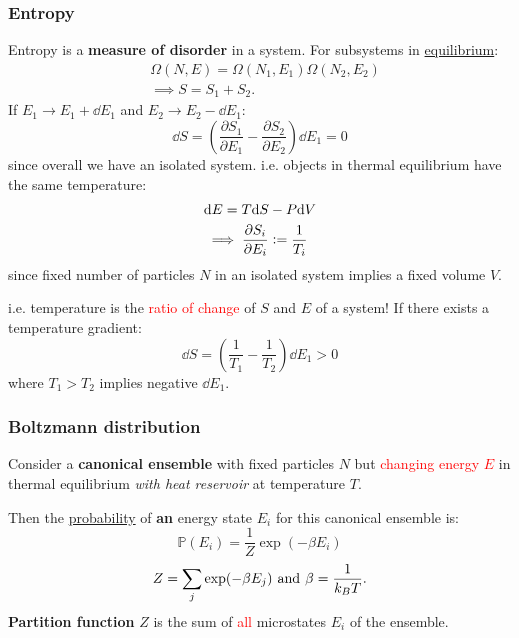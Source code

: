 \documentclass{article}
\newcommand{\deq}{\vcentcolon=}
\begin{document}
\begin{multicols*}{3}
\subsubsection*{Entropy}
Entropy is a \textbf{measure of disorder} in a system.
For subsystems in \underline{equilibrium}:
\begin{align*}
    &\Omega(N,E)=\Omega(N_1,E_1)\Omega(N_2,E_2) \\
    &\implies S=S_1+S_2.
\end{align*}
If $E_1\rightarrow E_1+\dd E_1$ and
$E_2\rightarrow E_2-\dd E_1$:
$$\dd S=\left(\frac{\partial S_1}{\partial E_1}
-\frac{\partial S_2}{\partial E_2}\right)\dd E_1=0$$
since overall we have an isolated system.
i.e. objects in thermal equilibrium have the same temperature:
\begin{align*}
    &\dd E=T\dd S-P\dd V \\
    &\implies\frac{\partial S_i}{\partial E_i}
    \deq\frac{1}{T_i}
\end{align*}
since fixed number of particles $N$ 
in an isolated system implies a fixed volume $V$.

i.e. temperature is the \textcolor{red}{ratio of change}
of $S$ and $E$ of a system!
If there exists a temperature gradient:
$$\dd S=\left(\frac{1}{T_1}-\frac{1}{T_2}\right)
\dd E_1>0$$ where $T_1>T_2$ implies negative $\dd E_1$.

\subsubsection*{Boltzmann distribution}
Consider a \textbf{canonical ensemble} with fixed particles $N$ but
\textcolor{red}{changing energy $E$} in thermal equilibrium
\textit{with heat reservoir} at temperature $T$.

Then the \underline{probability} of \textbf{an} energy state $E_i$ for
this canonical ensemble is:
$$\mathbb{P}(E_i)=\frac{1}{Z}\exp(-\beta E_i)$$
$$Z=\sum_j\exp(-\beta E_j)
\hspace{0.05in}\text{and}\hspace{0.05in}
\beta=\frac{1}{k_B T}.$$
\textbf{Partition function} $Z$
is the sum of \textcolor{red}{all} microstates $E_i$ of the ensemble.


\end{multicols*}
\end{document}
